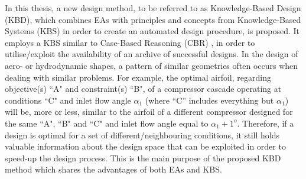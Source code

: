 In this thesis, a new design method, to be referred to as  Knowledge-Based Design (KBD), which combines EAs with principles and concepts from Knowledge-Based Systems (KBS) in order to create an automated design procedure, is proposed. It employs a KBS similar to Case-Based Reasoning (CBR) \cite{kolodner_1991,kolodner_1993,slade_1991,riesbeck_1989}, in order to utilise/exploit the availability of an archive of successful designs. In the design of aero- or hydrodynamic shapes, a pattern of similar geometries often occurs when dealing with similar problems. For example, the optimal airfoil, regarding objective(s) ``A" and constraint(s) ``B", of a compressor cascade operating at conditions ``C" and inlet flow angle $\alpha_1$ (where ``C'' includes everything but $\alpha_1$) will be, more or less, similar to the airfoil of a different compressor designed for the same ``A", ``B" and ``C" and inlet flow angle equal to $\alpha_1\!+\!1^o$.  Therefore, if a design is optimal for a set of different/neighbouring conditions, it still holds valuable information about the design space that can be exploited in order to speed-up the design process. This is the main purpose of the proposed KBD method which shares the advantages of both EAs and KBS.    

